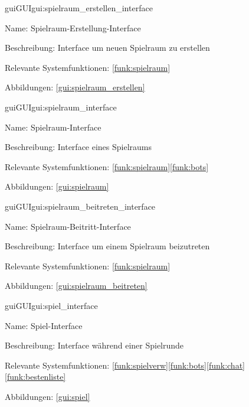 \begin{description}[leftmargin=5em, style=sameline]	
	\begin{lhp}{gui}{GUI}{gui:spielraum_erstellen_interface}
		\item[Name:] Spielraum-Erstellung-Interface
		\item[Beschreibung:] Interface um neuen Spielraum zu erstellen
		\item[Relevante Systemfunktionen:] \ref{funk:spielraum}
		\item[Abbildungen:] \ref{gui:spielraum_erstellen}
	\end{lhp}
\end{description}

\begin{description}[leftmargin=5em, style=sameline]	
	\begin{lhp}{gui}{GUI}{gui:spielraum_interface}
		\item[Name:] Spielraum-Interface
		\item[Beschreibung:] Interface eines Spielraums
		\item[Relevante Systemfunktionen:] \ref{funk:spielraum}\ref{funk:bots}
		\item[Abbildungen:] \ref{gui:spielraum}
	\end{lhp}
\end{description}

\begin{description}[leftmargin=5em, style=sameline]	
	\begin{lhp}{gui}{GUI}{gui:spielraum_beitreten_interface}
		\item[Name:] Spielraum-Beitritt-Interface
		\item[Beschreibung:] Interface um einem Spielraum beizutreten
		\item[Relevante Systemfunktionen:] \ref{funk:spielraum}
		\item[Abbildungen:] \ref{gui:spielraum_beitreten}
	\end{lhp}
\end{description}

\begin{description}[leftmargin=5em, style=sameline]	
	\begin{lhp}{gui}{GUI}{gui:spiel_interface}
		\item[Name:]Spiel-Interface
		\item[Beschreibung:] Interface während einer Spielrunde
		\item[Relevante Systemfunktionen:] \ref{funk:spielverw}\ref{funk:bots}\ref{funk:chat}\ref{funk:bestenliste}
		\item[Abbildungen:] \ref{gui:spiel}
	\end{lhp}
\end{description}

